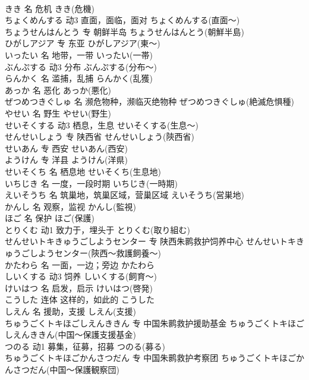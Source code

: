 \documentclass[8pt]{extreport}
\begin{document}
\begin{CJK}{UTF8}{min}
\\	きき	名	危机	きき(危機)	
\\	ちょくめんする	动3	直面，面临，面对	ちょくめんする(直面～)	
\\	ちょうせんはんとう	专	朝鲜半岛	ちょうせんはんとう(朝鮮半島)	
\\	ひがしアジア	专	东亚	ひがしアジア(東～)	
\\	いったい	名	地带，一带	いったい(一帯)	
\\	ぶんぷする	动3	分布	ぶんぷする(分布～)	
\\	らんかく	名	滥捕，乱捕	らんかく(乱獲)	
\\	あっか	名	恶化	あっか(悪化)	
\\	ぜつめつきぐしゅ	名	濒危物种，濒临灭绝物种	ぜつめつきぐしゅ(絶滅危惧種)	
\\	やせい	名	野生	やせい(野生)	
\\	せいそくする	动3	栖息，生息	せいそくする(生息～)	
\\	せんせいしょう	专	陕西省	せんせいしょう(陝西省)	
\\	せいあん	专	西安	せいあん(西安)	
\\	ようけん	专	洋县	ようけん(洋県)	
\\	せいそくち	名	栖息地	せいそくち(生息地)	
\\	いちじき	名	一度，一段时期	いちじき(一時期)	
\\	えいそうち	名	筑巢地，筑巢区域，营巢区域	えいそうち(営巣地)	
\\	かんし	名	观察，监视	かんし(監視)	
\\	ほご	名	保护	ほご(保護)	
\\	とりくむ	动1	致力于，埋头于	とりくむ(取り組む)	
\\	せんせいトキきゅうごしようセンター	专	陕西朱鹮救护饲养中心	せんせいトキきゅうごしようセンター(陝西～救護飼養～)	
\\	かたわら	名	一面，一边；旁边	かたわら	
\\	しいくする	动3	饲养	しいくする(飼育～)	
\\	けいはつ	名	启发，启示	けいはつ(啓発)	
\\	こうした	连体	这样的，如此的	こうした	
\\	しえん	名	援助，支援	しえん(支援)	
\\	ちゅうごくトキほごしえんききん	专	中国朱鹮救护援助基金	ちゅうごくトキほごしえんききん(中国～保護支援基金)	
\\	つのる	动1	募集，征募，招募	つのる(募る)	
\\	ちゅうごくトキほごかんさつだん	专	中国朱鹮救护考察团	ちゅうごくトキほごかんさつだん(中国～保護観察団)	

\end{CJK}
\end{document}
